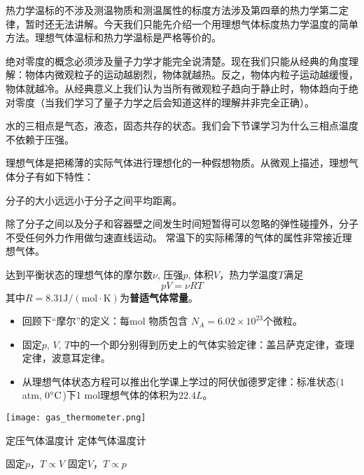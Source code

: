 \documentclass[CJK]{beamer}
\begin{document}
\begin{frame}
\bch
\bitem
\item{热力学温标的不涉及测温物质和测温属性的标度方法涉及第四章的热力学第二定律，暂时还无法讲解。今天我们只能先介绍一个用理想气体标度热力学温度的简单方法。理想气体温标和热力学温标是严格等价的。}
\item{绝对零度的概念必须涉及量子力学才能完全说清楚。现在我们只能从经典的角度理解：物体内微观粒子的运动越剧烈，物体就越热。反之，物体内粒子运动越缓慢，物体就越冷。从经典意义上我们认为当所有微观粒子趋向于静止时，物体趋向于绝对零度（当我们学习了量子力学之后会知道这样的理解并非完全正确）。}
\item{水的三相点是气态，液态，固态共存的状态。我们会下节课学习为什么三相点温度不依赖于压强。}
\eitem
\ech
\end{frame}


\begin{frame}
\bch
理想气体是把稀薄的实际气体进行理想化的一种假想物质。从微观上描述，理想气体分子有如下特性：
\bitem
\item{分子的大小远远小于分子之间平均距离。}
\item{除了分子之间以及分子和容器壁之间发生时间短暂得可以忽略的弹性碰撞外，分子不受任何外力作用做匀速直线运动。}
\eitem
常温下的实际稀薄的气体的属性非常接近理想气体。

\ech
\end{frame}



\begin{frame}
\bch
{\large 达到平衡状态的理想气体的摩尔数$\nu$, 压强$p$, 体积$V$，热力学温度$T$满足
{\color{blue}
$$p V = \nu RT$$
}
其中$R=8.31 \mathrm{J/(mol\cdot K)}$为{\bf 普适气体常量}。
}

{\small
\begin{itemize}
\item{回顾下“摩尔”的定义：每mol 物质包含 $N_A = 6.02\times 10^{23}$个微粒。}
\item{固定$p$, $V$, $T$中的一个即分别得到历史上的气体实验定律：盖吕萨克定律，查理定律，波意耳定律。}
\item{从理想气体状态方程可以推出化学课上学过的阿伏伽德罗定律：标准状态($1$ atm, $0^\circ \mathrm{C}$)下1 mol理想气体的体积为$22.4L$。}
\end{itemize}
}
\ech
\end{frame}

\begin{frame}
\bch

\texttt{[image: gas\_thermometer.png]}


定压气体温度计 \hspace{0.5in} 定体气体温度计

固定$p$，$T\propto V$ \hspace{0.6in}  固定$V$，$T\propto p$

\ech
\end{frame}
\end{document}
